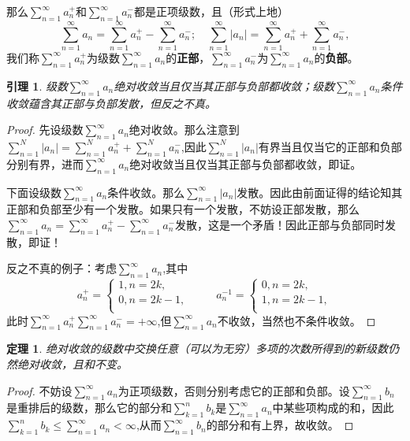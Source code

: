 \documentclass{article}
\newtheorem{theorem}{定理}[subsection]
\newtheorem{lemma}{引理}[subsection]
\begin{document}
那么$\sum_{n=1}^\infty a_n^+$和$\sum_{n=1}^\infty a_n^-$都是正项级数，且（形式上地）
$$
\sum_{n=1}^{\infty}{a_n}=\sum_{n=1}^{\infty}{a_{n}^{+}}-\sum_{n=1}^{\infty}{a_{n}^{-}};\hspace{1em}\sum_{n=1}^{\infty}{\left| a_n \right|}=\sum_{n=1}^{\infty}{a_{n}^{+}}+\sum_{n=1}^{\infty}{a_{n}^{-}},
$$
我们称$\sum_{n=1}^\infty a_n^+$为级数$\sum_{n=1}^\infty a_n$的\textbf{正部}，$\sum_{n=1}^\infty a_n^-$为$\sum_{n=1}^\infty a_n$的\textbf{负部}。
\begin{lemma}
级数$\sum_{n=1}^\infty a_n$绝对收敛当且仅当其正部与负部都收敛；级数$\sum_{n=1}^\infty a_n$条件收敛蕴含其正部与负部发散，但反之不真。
\end{lemma}
\begin{proof}
先设级数$\sum_{n=1}^\infty a_n$绝对收敛。那么注意到$\sum_{n=1}^N{\left| a_n \right|}=\sum_{n=1}^N{a_{n}^{+}}+\sum_{n=1}^N{a_{n}^{-}}$,因此$\sum_{n=1}^N|a_n|$有界当且仅当它的正部和负部分别有界，进而$\sum_{n=1}^\infty a_n$绝对收敛当且仅当其正部与负部都收敛，即证。\par
下面设级数$\sum_{n=1}^\infty a_n$条件收敛。那么$\sum_{n=1}^\infty |a_n|$发散。因此由前面证得的结论知其正部和负部至少有一个发散。如果只有一个发散，不妨设正部发散，那么$\sum_{n=1}^{\infty}{a_n}=\sum_{n=1}^{\infty}{a_{n}^{+}}-\sum_{n=1}^{\infty}{a_{n}^{-}}$发散，这是一个矛盾！因此正部与负部同时发散，即证！\par
反之不真的例子：考虑$\sum_{n=1}^\infty a_n$,其中
$$
a_{n}^{+}=\begin{cases}
	1,n=2k,\\
	0,n=2k-1,\\
\end{cases}\hspace{1cm}a_{n}^{-1}=\begin{cases}
	0,n=2k,\\
	1,n=2k-1,\\
\end{cases}
$$
此时$\sum_{n=1}^\infty a_n^+\sum_{n=1}^\infty a_n^-=+\infty$,但$\sum_{n=1}^\infty a_n$不收敛，当然也不条件收敛。
\end{proof}
\begin{theorem}
绝对收敛的级数中交换任意（可以为无穷）多项的次数所得到的新级数仍然绝对收敛，且和不变。
\end{theorem}
\begin{proof}
不妨设$\sum_{n=1}^\infty a_n$为正项级数，否则分别考虑它的正部和负部。设$\sum_{n=1}^\infty b_n$是重排后的级数，那么它的部分和$\sum_{k=1}^n b_k$是$\sum_{n=1}^\infty a_n$中某些项构成的和，因此$\sum_{k=1}^nb_k\le\sum_{n=1}^\infty a_n<\infty$,从而$\sum_{n=1}^\infty b_n$的部分和有上界，故收敛。
\end{proof}
\end{document}
